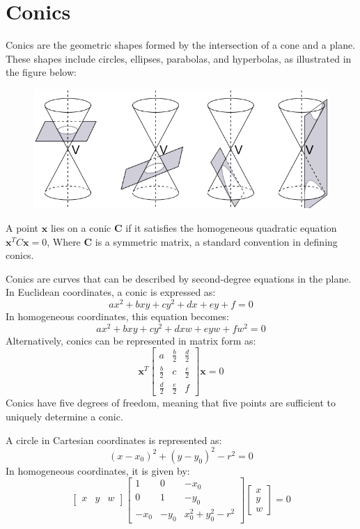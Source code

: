 \section{Conics}

Conics are the geometric shapes formed by the intersection of a cone and a plane. 
These shapes include circles, ellipses, parabolas, and hyperbolas, as illustrated in the figure below:
\begin{figure}[H]
    \centering
    \includegraphics[width=0.5\linewidth]{images/conics.png}
\end{figure}
\begin{definition}
    A point $\mathbf{x}$  lies on a conic $\mathbf{C}$ if it satisfies the homogeneous quadratic equation $\mathbf{x}^TC\mathbf{x}=0$, Where $\mathbf{C}$ is a symmetric matrix, a standard convention in defining conics.
\end{definition}
Conics are curves that can be described by second-degree equations in the plane. 
In Euclidean coordinates, a conic is expressed as:
\[ax^2+bxy+cy^2+dx+ey+f=0\]
In homogeneous coordinates, this equation becomes:
\[ax^2+bxy+cy^2+dxw+eyw+fw^2=0\]
Alternatively, conics can be represented in matrix form as:
\[\mathbf{x}^T \begin{bmatrix} a & \frac{b}{2} & \frac{d}{2} \\ \frac{b}{2} & c & \frac{e}{2} \\ \frac{d}{2} & \frac{e}{2} & f \end{bmatrix} \mathbf{x}=0\]
Conics have five degrees of freedom, meaning that five points are sufficient to uniquely determine a conic.
\begin{example}
    A circle in Cartesian coordinates is represented as:
    \[(x-x_0)^2+(y-y_0)^2-r^2=0\]
    In homogeneous coordinates, it is given by:
    \[\begin{bmatrix} x & y & w \end{bmatrix} \begin{bmatrix} 1 & 0 & -x_0 \\ 0 & 1 & -y_0 \\ -x_0 & -y_0 & x_0^2+y_0^2-r^2 \end{bmatrix} \begin{bmatrix} x \\ y \\ w \end{bmatrix} = 0\]
\end{example}

